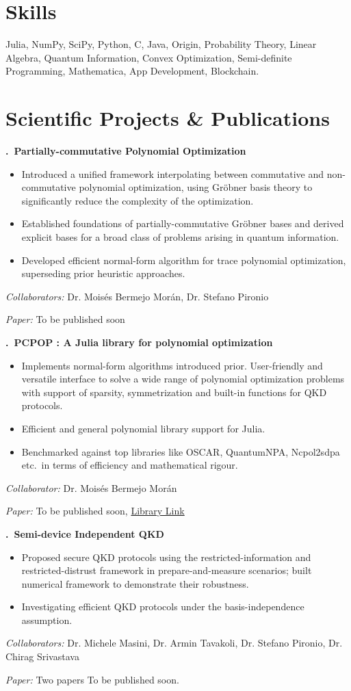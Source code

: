 \documentclass[a4paper,11pt]{article}
\newcounter{projectnum}
\newcommand{\projectentry}[5]{%
  \stepcounter{projectnum}
  \vspace{0.5em}\noindent
  {\bfseries \theprojectnum.\ #1}\par\vspace{-0.3em}
  \begin{itemize}[leftmargin=1.2em, itemsep=0pt, parsep=0pt, topsep=0.15em]
    #2
  \end{itemize}\vspace{-0.2em}
  \textit{#3:} #4\par
  \textit{Paper:} #5\par\vspace{0.4em}
}
\begin{document}
\section*{Skills}
Julia, NumPy, SciPy, Python, C, Java, Origin, Probability Theory, Linear Algebra, Quantum Information, Convex Optimization, Semi-definite Programming,
Mathematica, App Development, Blockchain.


\section*{Scientific Projects \& Publications}
\setcounter{projectnum}{0}
\projectentry{Partially-commutative Polynomial Optimization}{
  \item Introduced a unified framework interpolating between commutative and non-commutative polynomial optimization, using Gr\"obner basis theory to significantly reduce the complexity of the optimization.
  \item Established foundations of partially-commutative Gr\"obner bases and derived explicit bases for a broad class of problems arising in quantum information.
  \item Developed efficient normal-form algorithm for trace polynomial optimization, superseding prior heuristic approaches.
}{Collaborators}{Dr. Moisés Bermejo Morán, Dr. Stefano Pironio}{To be published soon}

\projectentry{PCPOP : A Julia library for polynomial optimization}{\item Implements normal-form algorithms introduced prior. User-friendly and versatile interface to solve a wide range of polynomial optimization problems with support of sparsity, symmetrization and built-in functions for QKD protocols. \item Efficient and general polynomial library support for Julia. \item Benchmarked against top libraries like OSCAR, QuantumNPA, Ncpol2sdpa etc.\ in terms of efficiency and mathematical rigour.}{Collaborator}{Dr. Moisés Bermejo Morán}{To be published soon,  \href{https://github.com/abh1mishra/PCPOP/tree/main}{Library Link}}

\projectentry{Semi-device Independent QKD}{\item Proposed secure QKD protocols using the restricted-information and restricted-distrust framework in prepare-and-measure scenarios; built numerical framework to demonstrate their robustness. \item Investigating efficient QKD protocols under the basis-independence assumption. }{Collaborators}{Dr. Michele Masini, Dr. Armin Tavakoli, Dr. Stefano Pironio, Dr. Chirag Srivastava}{Two papers To be published soon.}
\end{document}
